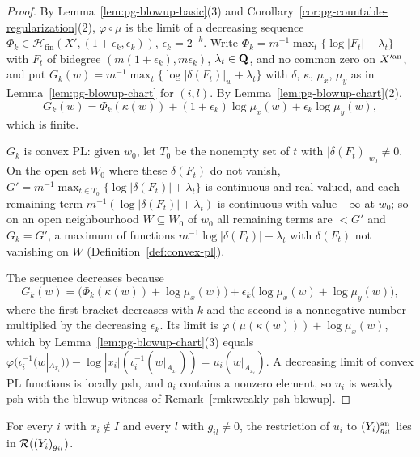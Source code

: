 \begin{proof}
By Lemma~\ref{lem:pg-blowup-basic}(3) and Corollary~\ref{cor:pg-countable-regularization}(2), $\varphi\circ\mu$ is the limit of a decreasing sequence
$\Phi_k\in\mathcal H_{\mathrm{fin}}(X',(1+\epsilon_k,\epsilon_k))$, $\epsilon_k=2^{-k}$. Write $\Phi_k=m^{-1}\max_t\{\log|F_t|+\lambda_t\}$ with $F_t$ of bidegree
$(m(1+\epsilon_k),m\epsilon_k)$, $\lambda_t\in\mathbf{Q}$, and no common zero on $X'^{\mathrm{an}}$, and put $G_k(w)=m^{-1}\max_t\{\log|\delta(F_t)|_w+\lambda_t\}$ with
$\delta$, $\kappa$, $\mu_x$, $\mu_y$ as in Lemma~\ref{lem:pg-blowup-chart} for $(i,l)$. By Lemma~\ref{lem:pg-blowup-chart}(2),
\[
G_k(w)=\Phi_k(\kappa(w))+(1+\epsilon_k)\log\mu_x(w)+\epsilon_k\log\mu_y(w),
\]
which is finite.

$G_k$ is convex PL: given $w_0$, let $T_0$ be the nonempty set of $t$ with $|\delta(F_t)|_{w_0}\ne0$. On the open set $W_0$ where these
$\delta(F_t)$ do not vanish, $G'=m^{-1}\max_{t\in T_0}\{\log|\delta(F_t)|+\lambda_t\}$ is continuous and real valued, and each remaining term
$m^{-1}(\log|\delta(F_t)|+\lambda_t)$ is continuous with value $-\infty$ at $w_0$; so on an open neighbourhood $W\subseteq W_0$ of $w_0$ all remaining
terms are $<G'$ and $G_k=G'$, a maximum of functions $m^{-1}\log|\delta(F_t)|+\lambda_t$ with $\delta(F_t)$ not vanishing on $W$
(Definition~\ref{def:convex-pl}).

The sequence decreases because
\[
G_k(w)=\bigl(\Phi_k(\kappa(w))+\log\mu_x(w)\bigr)
       +\epsilon_k\bigl(\log\mu_x(w)+\log\mu_y(w)\bigr),
\]
where the first
bracket decreases with $k$ and the second is a nonnegative number multiplied by the decreasing $\epsilon_k$. Its limit is
$\varphi(\mu(\kappa(w)))+\log\mu_x(w)$, which by Lemma~\ref{lem:pg-blowup-chart}(3) equals
$\varphi(\iota_i^{-1}(w|_{A_{x_i}}))-\log|x_i|(\iota_i^{-1}(w|_{A_{x_i}}))=u_i(w|_{A_{x_i}})$. A decreasing limit of convex PL functions is locally psh, and
$\mathfrak a_i$ contains a nonzero element, so $u_i$ is weakly psh with the blowup witness of Remark~\ref{rmk:weakly-psh-blowup}.
\end{proof}

\begin{lemma}\label{lem:pg-descent-cover}
\leanok
{}
For every $i$ with $x_i\notin I$ and every $l$ with $g_{il}\ne0$, the restriction of $u_i$ to $(Y_i)_{g_{il}}^{\mathrm{an}}$ lies in $\mathcal{R}((Y_i)_{g_{il}})$.
\end{lemma}

